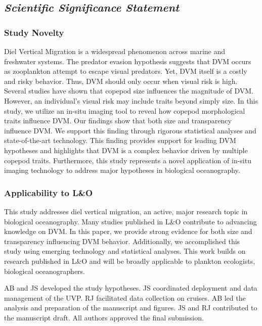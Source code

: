 \documentclass[
]{article}
\begin{document}
\hypertarget{scientific-significance-statement}{%
\subsection{\texorpdfstring{\emph{Scientific Significance
Statement}}{Scientific Significance Statement}}\label{scientific-significance-statement}}

\hypertarget{study-novelty}{%
\subsubsection{Study Novelty}\label{study-novelty}}

Diel Vertical Migration is a widespread phenomenon across marine and
freshwater systems. The predator evasion hypothesis suggests that DVM
occurs as zooplankton attempt to escape visual predators. Yet, DVM
itself is a costly and risky behavior. Thus, DVM should only occur when
visual risk is high. Several studies have shown that copepod size
influences the magnitude of DVM. However, an individual's visual risk
may include traits beyond simply size. In this study, we utilize an
in-situ imaging tool to reveal how copepod morphological traits
influence DVM. Our findings show that both size and transparency
influence DVM. We support this finding through rigorous statistical
analyses and state-of-the-art technology. This finding provides support
for leading DVM hypotheses and highlights that DVM is a complex behavior
driven by multiple copepod traits. Furthermore, this study represents a
novel application of in-situ imaging technology to address major
hypotheses in biological oceanography.

\hypertarget{applicability-to-lo}{%
\subsubsection{Applicability to L\&O}\label{applicability-to-lo}}

This study addresses diel vertical migration, an active, major research
topic in biological oceanography. Many studies published in L\&O
contribute to advancing knowledge on DVM. In this paper, we provide
strong evidence for both size and transparency influencing DVM behavior.
Additionally, we accomplished this study using emerging technology and
statistical analyses. This work builds on research published in L\&O and
will be broadly applicable to plankton ecologists, biological
oceanographers.

AB and JS developed the study hypotheses. JS coordinated deployment and
data management of the UVP. RJ facilitated data collection on cruises.
AB led the analysis and preparation of the manuscript and figures. JS
and RJ contributed to the manuscript draft. All authors approved the
final submission.
\end{document}
